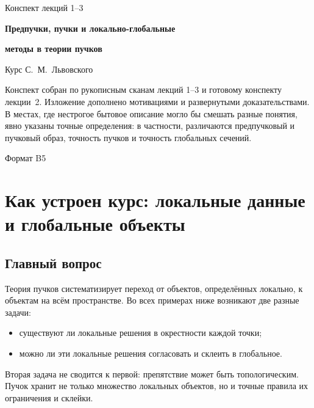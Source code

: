 \documentclass[11pt,b5paper,oneside]{article}
\theoremstyle{plain}
\theoremstyle{definition}
\theoremstyle{remark}
\begin{document}
\thispagestyle{empty}
\vspace*{1.3cm}
\begin{center}
{\Large Конспект лекций 1--3\par}
\vspace{.7cm}
{\LARGE\bfseries Предпучки, пучки и локально-глобальные\par}
{\LARGE\bfseries методы в теории пучков\par}
\vspace{.8cm}
{\large Курс С.~М.~Львовского\par}
\vspace{1.2cm}
\begin{minipage}{.82\textwidth}
\centering
Конспект собран по рукописным сканам лекций 1--3 и готовому
конспекту лекции~2. Изложение дополнено мотивациями и развернутыми
доказательствами. В местах, где нестрогое бытовое описание могло бы
смешать разные понятия, явно указаны точные определения: в частности,
различаются предпучковый и пучковый образ, точность пучков и точность
глобальных сечений.
\end{minipage}
\vfill
{\small Формат B5\par}
\end{center}
\clearpage

\tableofcontents
\clearpage

\section{Как устроен курс: локальные данные и глобальные объекты}

\subsection{Главный вопрос}
Теория пучков систематизирует переход от объектов, определённых
локально, к объектам на всём пространстве. Во всех примерах ниже
возникают две разные задачи:
\begin{itemize}
\item существуют ли локальные решения в окрестности каждой точки;
\item можно ли эти локальные решения согласовать и склеить в глобальное.
\end{itemize}
Вторая задача не сводится к первой: препятствие может быть топологическим.
Пучок хранит не только множество локальных объектов, но и точные правила
их ограничения и склейки.
\end{document}
